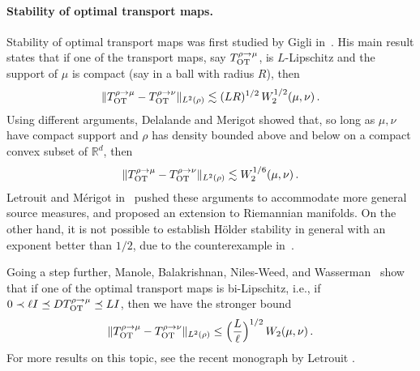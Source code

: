 \documentclass[12pt]{article}
\newcommand{\RR}{\mathbb{R}}
\newcommand{\R}{\RR}
\newcommand{\1}{\mathds{1}}
\theoremstyle{plain}
\theoremstyle{definition}
\theoremstyle{remark}
\begin{document}
\paragraph{Stability of optimal transport maps.} Stability of optimal transport maps was first studied by Gigli in~\cite{gigli2011holder}. His main result states that if one of the transport maps, say $T^{\rho\to\mu}_{\rm OT}$, is $L$-Lipschitz and the support of $\mu$ is compact (say in a ball with radius $R$), then
\begin{align*}
\|T^{\rho\to\mu}_{\rm OT} - T_{\rm OT}^{\rho\to\nu}\|_{L^2(\rho)} \lesssim (LR)^{1/2}\, W_2^{1/2}(\mu,\nu)\,.
\end{align*}
{Using different arguments, Delalande and Merigot \cite{delalande2023quantitative} showed that, so long as $\mu,\nu$ have compact support and $\rho$ has density bounded above and below on a compact convex subset of $\R^d$, then 
\begin{align*}
\|T^{\rho\to\mu}_{\rm OT} - T_{\rm OT}^{\rho\to\nu}\|_{L^2(\rho)} \lesssim W_2^{1/6}(\mu,\nu)\,.
\end{align*}
Letrouit and M\'erigot in~\cite{letrouit2024gluing} pushed these arguments to accommodate more general source measures, and \cite{kitagawa2025stability} proposed an extension to Riemannian manifolds.} 
On the other hand, it is not possible to establish H\"older stability in general with an exponent better than $1/2$, due to the counterexample in~\cite{gigli2011holder}.

Going a step further, Manole, Balakrishnan, Niles-Weed, and Wasserman~\cite{manole2024plugin} show that if one of the optimal transport maps is bi-Lipschitz, i.e., if $0 \prec \ell I \preceq D T^{\rho\to\mu}_{\rm OT} \preceq L I$, then we have the stronger bound
\begin{align*}
\|T^{\rho\to\mu}_{\rm OT} - T_{\rm OT}^{\rho\to\nu}\|_{L^2(\rho)} \leq \Bigl(\frac{L}{\ell}\Bigr)^{1/2}\, W_2(\mu,\nu)\,.
\end{align*}
For more results on this topic, see the recent monograph by Letrouit \cite{letrouit2025quantitative}. 
\end{document}
